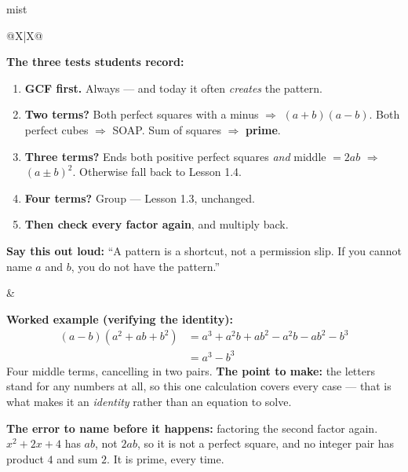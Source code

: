 \documentclass[10pt]{article}
\begin{document}
\boxguard
\begin{skillbox}{mist}
\begin{tabularx}{\linewidth}{@{}X|X@{}}
\begin{minipage}[t]{\linewidth}\vspace{0pt}
\textbf{The three tests students record:}
\begin{enumerate}[leftmargin=1.4em, itemsep=2pt, topsep=2pt]
  \item \textbf{GCF first.} Always --- and today it often \emph{creates} the pattern.
  \item \textbf{Two terms?} Both perfect squares with a minus $\Rightarrow$ $(a+b)(a-b)$. Both
        perfect cubes $\Rightarrow$ SOAP. Sum of squares $\Rightarrow$ \textbf{prime}.
  \item \textbf{Three terms?} Ends both positive perfect squares \emph{and} middle $=2ab$
        $\Rightarrow$ $(a \pm b)^2$. Otherwise fall back to Lesson 1.4.
  \item \textbf{Four terms?} Group --- Lesson 1.3, unchanged.
  \item \textbf{Then check every factor again}, and multiply back.
\end{enumerate}
\textbf{Say this out loud:} ``A pattern is a shortcut, not a permission slip. If you cannot name
$a$ and $b$, you do not have the pattern.''
\end{minipage}
&
\begin{minipage}[t]{\linewidth}\vspace{0pt}
\textbf{Worked example (verifying the identity):}
\[
\begin{aligned}
(a-b)\left(a^2+ab+b^2\right) &= a^3+a^2b+ab^2-a^2b-ab^2-b^3 \\
                             &= a^3-b^3
\end{aligned}
\]
Four middle terms, cancelling in two pairs. \textbf{The point to make:} the letters stand for any
numbers at all, so this one calculation covers every case --- that is what makes it an
\emph{identity} rather than an equation to solve.

\textbf{The error to name before it happens:} factoring the second factor again.
$x^2+2x+4$ has $ab$, not $2ab$, so it is not a perfect square, and no integer pair has product $4$
and sum $2$. It is prime, every time.
\end{minipage}
\end{tabularx}
\end{skillbox}
\end{document}
